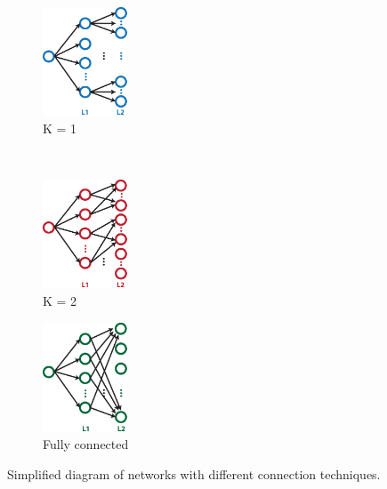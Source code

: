 \documentclass{article} %
\begin{document}
\begin{figure}
        \centering
         \label{fig-secondconnex}
        \begin{subfigure}[b]{0.3\textwidth}
                \centering
                \includegraphics[width=1.0in]{fig-diagram-fanin1.eps}
                \caption{K = 1}
                \label{fig-secondconnex-fanin1}
        \end{subfigure}%
        ~%
          \begin{subfigure}[b]{0.3\textwidth}
                \centering
                \includegraphics[width=1.0in]{fig-diagram-fanin2.eps}
                \caption{K = 2}
                \label{fig-secondconnex-fanin2}                
        \end{subfigure}%
        \begin{subfigure}[b]{0.3\textwidth}
                \centering
                \includegraphics[width=1.0in]{fig-diagram-faninall.eps}
                \caption{Fully connected}
                \label{fig-secondconnex-full}
        \end{subfigure}
        \caption{Simplified diagram of networks with different connection techniques.}
\end{figure}
\end{document}
